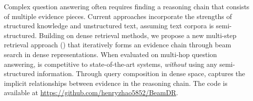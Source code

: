 
Complex question answering often requires finding
a reasoning chain that consists of 
multiple evidence pieces.
%
Current approaches incorporate the strengths 
of structured knowledge and unstructured text,
assuming text corpora is semi-structured. 
%
Building on dense retrieval methods,
we propose a new multi-step retrieval approach (\name{})
that iteratively forms an evidence chain through beam search in 
dense representations.
%
When evaluated on multi-hop question answering, \name{} is competitive
to state-of-the-art systems, \emph{without} using any semi-structured
information.
%
Through query composition in dense space, 
\name{} captures the implicit relationships between evidence 
in the reasoning chain.  The code is available at \url{https://github.com/henryzhao5852/BeamDR}. 


